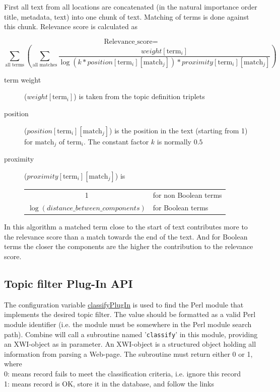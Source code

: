First all text from all locations are concatenated (in the natural importance order
title, metadata, text) into one chunk of text. Matching of terms is done
against this chunk. Relevance score is calculated as

\vbox{
\[ \mbox{Relevance\_score} = \]
\[ \sum_{\mbox{all terms}} \left( \sum_{\mbox{all matches}}
\frac{weight[\mbox{term}_{i}]}{\log(k * position[\mbox{term}_{i}][\mbox{match}_{j}]) * proximity[\mbox{term}_{i}][\mbox{match}_{j}]} \right) \]}

\begin{description}
\item[term weight] ($weight[\mbox{term}_{i}]$) is taken from the topic
 definition triplets

\item[position] ($position[\mbox{term}_{i}][\mbox{match}_{j}]$) is the position
in the text (starting from 1) for $\mbox{match}_{j}$ of $\mbox{term}_{i}$.
The constant factor $k$ is normally $0.5$

\item[proximity] ($proximity[\mbox{term}_{i}][\mbox{match}_{j}]$) is

\begin{tabular}{cl}
 1 & for non Boolean terms\\
 $\log(distance\_between\_components)$ & for Boolean terms\\
\end{tabular}
\end{description}

In this algorithm a matched term close to the start of text contributes
more to the relevance score than a match towards the end of the
text. And for Boolean terms the closer the components are the higher
the contribution to the relevance score.

\subsection{Topic filter Plug-In API}
The configuration variable \hyperref{classifyPlugIn}{classifyPlugIn (section }{)}{classifyPlugIn} is used to find
the Perl module that implements the desired topic filter.
The value should be formatted as a valid Perl module identifier (i.e.
the module must be somewhere in the Perl module search path).
Combine will call a subroutine named '\verb+classify+' in this module,
providing an XWI-object as in parameter. An XWI-object is a structured object holding all information from
parsing a Web-page.
The subroutine must
return either 0 or 1, where\\
\hspace*{\parindent}0: means record fails to meet the classification criteria, i.e. ignore this record\\
\hspace*{\parindent}1: means record is OK, store it in the database, and follow the links

